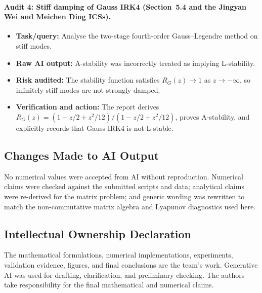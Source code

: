 \paragraph{Audit 4: Stiff damping of Gauss IRK4
(Section~5.4 and the Jingyan Wei and Meichen Ding ICSs).}
\begin{itemize}[leftmargin=1.5em, itemsep=2pt]
    \item \textbf{Task/query:} Analyse the two-stage fourth-order
    Gauss--Legendre method on stiff modes.
    \item \textbf{Raw AI output:} A-stability was incorrectly treated as
    implying L-stability.
    \item \textbf{Risk audited:} The stability function satisfies
    $R_G(z)\to1$ as $z\to-\infty$, so infinitely stiff modes are not strongly
    damped.
    \item \textbf{Verification and action:} The report derives
    $R_G(z)=(1+z/2+z^2/12)/(1-z/2+z^2/12)$, proves A-stability, and explicitly
    records that Gauss IRK4 is not L-stable.
\end{itemize}

\subsection*{Changes Made to AI Output}
No numerical values were accepted from AI without reproduction. Numerical
claims were checked against the submitted scripts and data; analytical claims
were re-derived for the matrix problem; and generic wording was rewritten to
match the non-commutative matrix algebra and Lyapunov diagnostics used here.

\subsection*{Intellectual Ownership Declaration}
The mathematical formulations, numerical implementations, experiments,
validation evidence, figures, and final conclusions are the team's work.
Generative AI was used for drafting, clarification, and preliminary checking.
The authors take responsibility for the final mathematical and numerical
claims.

